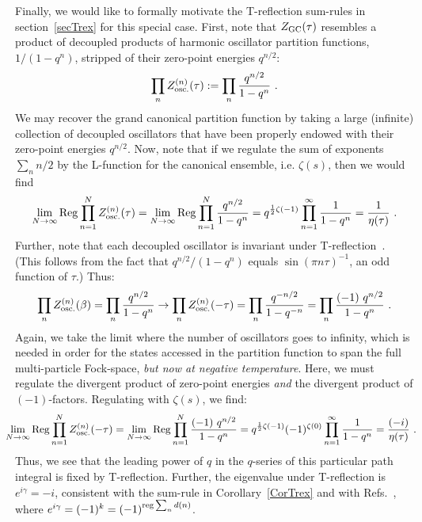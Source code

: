 \documentclass[11pt,a4paper]{article}
\newcommand{\g}{\gamma}
\newcommand{\reg}{{\rm reg}}
\newcommand{\Reg}{{\rm Reg}}
\begin{document}
Finally, we would like to formally motivate the T-reflection sum-rules in section~\ref{secTrex} for this special case. First, note that $Z_{\rm GC}(\tau)$ resembles a product of decoupled products of harmonic oscillator partition functions, $1/(1-q^n)$, stripped of their zero-point energies $q^{n/2}$:
\begin{align}
\prod_n Z_{\rm osc.}^{(n)}(\tau) := \prod_n \frac{q^{n/2}}{1-q^n}~.
\end{align}
We may recover the grand canonical partition function by taking a large (infinite) collection of decoupled oscillators that have been properly endowed with their zero-point energies $q^{n/2}$. Now, note that if we regulate the sum of exponents $\sum_n n/2$ by the L-function for the canonical ensemble, i.e. $\zeta(s)$, then we would find
\begin{align}
\lim_{N \to \infty} \Reg \prod_{n = 1}^{N} Z_{\rm osc.}^{(n)}(\tau) = \lim_{N \to \infty} \Reg \prod_{n = 1}^{N} \frac{q^{n/2}}{1-q^n} = q^{\frac{1}{2} \zeta(-1)} \prod_{n = 1}^{\infty} \frac{1}{1-q^n} = \frac{1}{\eta(\tau)}~.
\end{align}
Further, note that each decoupled oscillator is invariant under T-reflection~\cite{14T-rex0, 06T-rex1}. (This follows from the fact that $q^{n/2}/(1-q^{n})$ equals $\sin(\pi n \tau)^{-1}$, an odd function of $\tau$.) Thus:
\begin{align}
\prod_n Z_{\rm osc.}^{(n)}(\beta) = \prod_n \frac{q^{n/2}}{1-q^n} \to 
\prod_n Z_{\rm osc.}^{(n)}(-\tau)= \prod_n \frac{q^{-n/2}}{1-q^{-n}} = \prod_n \frac{(-1)~q^{n/2}}{1-q^n}~.
\end{align}
Again, we take the limit where the number of oscillators goes to infinity, which is needed in order for the states accessed in the partition function to span the full multi-particle Fock-space, {\em but now at negative temperature}. Here, we must regulate the divergent product of zero-point energies {\em and} the divergent product of $(-1)$-factors. Regulating with $\zeta(s)$, we find:
\begin{align}
\!\!\!\!\!\!
\lim_{N \to \infty} \Reg \prod_{n = 1}^{N} Z_{\rm osc.}^{(n)}(-\tau) = \lim_{N \to \infty} \Reg \prod_{n = 1}^{N} \frac{(-1)~q^{n/2}}{1-q^n} = q^{\frac{1}{2} \zeta(-1)} (-1)^{\zeta(0)} \prod_{n = 1}^{\infty} \frac{1}{1-q^n} = \frac{(-i)}{\eta(\tau)}~.\!\!
\end{align}
Thus, we see that the leading power of $q$ in the $q$-series of this particular path integral is fixed by T-reflection. Further, the eigenvalue under T-reflection is $e^{i \g}= -i$, consistent with the sum-rule in Corollary~\ref{CorTrex} and with Refs.~\cite{06T-rex1, 07T-rex2, 14T-rex0, 30T-rex2-GL2}, where $e^{i \g} = (-1)^k = (-1)^{\reg \sum_n d(n)}$. 
\end{document}
